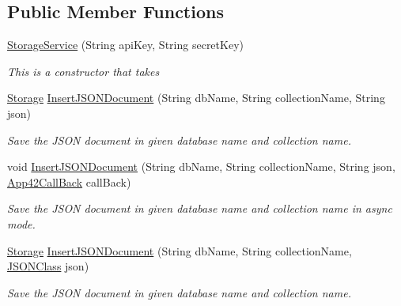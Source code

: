 \subsection*{Public Member Functions}
\begin{DoxyCompactItemize}
\item 
\hyperlink{classcom_1_1shephertz_1_1app42_1_1paas_1_1sdk_1_1csharp_1_1storage_1_1_storage_service_a5a02bf4be18d6a419aa3e0c7af8e1f28}{Storage\+Service} (String api\+Key, String secret\+Key)
\begin{DoxyCompactList}\small\item\em This is a constructor that takes \end{DoxyCompactList}\item 
\hyperlink{classcom_1_1shephertz_1_1app42_1_1paas_1_1sdk_1_1csharp_1_1storage_1_1_storage}{Storage} \hyperlink{classcom_1_1shephertz_1_1app42_1_1paas_1_1sdk_1_1csharp_1_1storage_1_1_storage_service_a3e6d5625da41b2800d58a8730c57e203}{Insert\+J\+S\+O\+N\+Document} (String db\+Name, String collection\+Name, String json)
\begin{DoxyCompactList}\small\item\em Save the J\+S\+O\+N document in given database name and collection name. \end{DoxyCompactList}\item 
void \hyperlink{classcom_1_1shephertz_1_1app42_1_1paas_1_1sdk_1_1csharp_1_1storage_1_1_storage_service_aa9cdf0c29dd9231e4ad593613bcabfdd}{Insert\+J\+S\+O\+N\+Document} (String db\+Name, String collection\+Name, String json, \hyperlink{interfacecom_1_1shephertz_1_1app42_1_1paas_1_1sdk_1_1csharp_1_1_app42_call_back}{App42\+Call\+Back} call\+Back)
\begin{DoxyCompactList}\small\item\em Save the J\+S\+O\+N document in given database name and collection name in async mode. \end{DoxyCompactList}\item 
\hyperlink{classcom_1_1shephertz_1_1app42_1_1paas_1_1sdk_1_1csharp_1_1storage_1_1_storage}{Storage} \hyperlink{classcom_1_1shephertz_1_1app42_1_1paas_1_1sdk_1_1csharp_1_1storage_1_1_storage_service_afd892eefd5c52660a5d58edcb2c57225}{Insert\+J\+S\+O\+N\+Document} (String db\+Name, String collection\+Name, \hyperlink{class_simple_j_s_o_n_1_1_j_s_o_n_class}{J\+S\+O\+N\+Class} json)
\begin{DoxyCompactList}\small\item\em Save the J\+S\+O\+N document in given database name and collection name. \end{DoxyCompactList}\item 

\end{DoxyCompactItemize}
